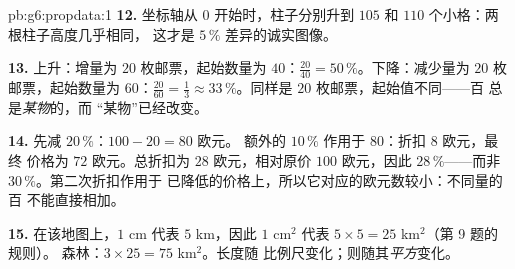 \begin{solution}{pb:g6:propdata:1}
\textbf{12.} 坐标轴从 $0$ 开始时，柱子分别升到 $105$ 和
$110$ 个小格：两根柱子高度几乎相同，
这才是 $5\,\%$ 差异的诚实图像。

\textbf{13.} 上升：增量为 $20$ 枚邮票，起始数量为
$40$：$\frac{20}{40} = 50\,\%$。下降：减少量为 $20$
枚邮票，起始数量为 $60$：$\frac{20}{60} = \frac13 \approx
33\,\%$。同样是 $20$ 枚邮票，起始值不同——百
总是\emph{某物}的，而
“某物”已经改变。

\textbf{14.} 先减 $20\,\%$：$100 - 20 = 80$ 欧元。
额外的 $10\,\%$ 作用于 $80$：折扣 $8$ 欧元，最终
价格为 $72$ 欧元。总折扣为 $28$ 欧元，相对原价 $100$ 欧元，因此
$28\,\%$——而非 $30\,\%$。第二次折扣作用于
已降低的价格上，所以它对应的欧元数较小：不同量的百
不能直接相加。

\textbf{15.} 在该地图上，$1$ cm 代表 $5$ km，因此 $1$
cm$^2$ 代表 $5 \times 5 = 25$ km$^2$（第 9 题的规则）。
森林：$3 \times 25 = 75$ km$^2$。长度随
比例尺变化；则随其\emph{平方}变化。
\end{solution}
